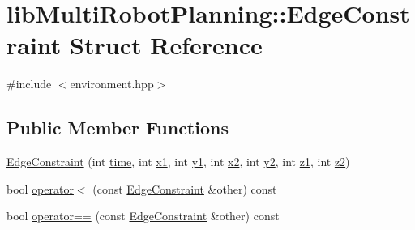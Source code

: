 \hypertarget{structlib_multi_robot_planning_1_1_edge_constraint}{}\section{lib\+Multi\+Robot\+Planning\+:\+:Edge\+Constraint Struct Reference}
\label{structlib_multi_robot_planning_1_1_edge_constraint}


{\ttfamily \#include $<$environment.\+hpp$>$}

\subsection*{Public Member Functions}
\begin{DoxyCompactItemize}
\item 
\hyperlink{structlib_multi_robot_planning_1_1_edge_constraint_a99e91352e19b17233c6b61d349d0b19c}{Edge\+Constraint} (int \hyperlink{structlib_multi_robot_planning_1_1_edge_constraint_a8bd6fcef2fd4363eeadc745cc4e86856}{time}, int \hyperlink{structlib_multi_robot_planning_1_1_edge_constraint_a295a57c0bb1d28adcedbb1c7e3ef15d5}{x1}, int \hyperlink{structlib_multi_robot_planning_1_1_edge_constraint_afba78e3bb5f1871ab6ca9f9928d27a14}{y1}, int \hyperlink{structlib_multi_robot_planning_1_1_edge_constraint_a332ed5352c22e7f359391381f55be3fa}{x2}, int \hyperlink{structlib_multi_robot_planning_1_1_edge_constraint_a3adb69f16ba037b5c45491d757e7456c}{y2}, int \hyperlink{structlib_multi_robot_planning_1_1_edge_constraint_a3a036db6b350499c79043df2b42dc709}{z1}, int \hyperlink{structlib_multi_robot_planning_1_1_edge_constraint_aff60d0e728647f8d80dcd6925f0e3f58}{z2})
\item 
bool \hyperlink{structlib_multi_robot_planning_1_1_edge_constraint_a24d986f0dc3c7d2f3d962504b1be2aae}{operator$<$} (const \hyperlink{structlib_multi_robot_planning_1_1_edge_constraint}{Edge\+Constraint} \&other) const
\item 
bool \hyperlink{structlib_multi_robot_planning_1_1_edge_constraint_a22a37c44f94821460ca46267da2361a3}{operator==} (const \hyperlink{structlib_multi_robot_planning_1_1_edge_constraint}{Edge\+Constraint} \&other) const
\end{DoxyCompactItemize}

